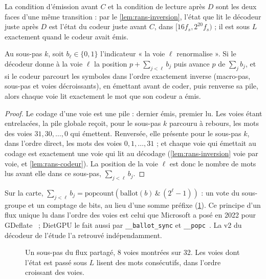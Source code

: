 La condition d'émission avant $C$ et la condition de lecture après $D$ sont les deux faces d'une même transition : par le \cref{lem:rans-inversion}, l'état que lit le décodeur juste après $D$ est l'état du codeur juste avant $C$, dans $[16 f_s, 2^{20} f_s)$ ; il est sous $L$ exactement quand le codeur avait émis.

\begin{lemme}\label{lem:flux-partage}
Au sous-pas $k$, soit $b_\ell \in \{0,1\}$ l'indicateur « la voie $\ell$ renormalise ». Si le décodeur donne à la voie $\ell$ la position $p + \sum_{j<\ell} b_j$ puis avance $p$ de $\sum_j b_j$, et si le codeur parcourt les symboles dans l'ordre exactement inverse (macro-pas, sous-pas et voies décroissants), en émettant avant de coder, puis renverse sa pile, alors chaque voie lit exactement le mot que son codeur a émis.
\end{lemme}

\begin{proof}
Le codage d'une voie est une pile : dernier émis, premier lu. Les voies étant entrelacées, la pile globale reçoit, pour le sous-pas $k$ parcouru à rebours, les mots des voies $31, 30, \ldots, 0$ qui émettent. Renversée, elle présente pour le sous-pas $k$, dans l'ordre direct, les mots des voies $0, 1, \ldots, 31$ ; et chaque voie qui émettait au codage est exactement une voie qui lit au décodage (\cref{lem:rans-inversion} voie par voie, et \cref{lem:rans-codeur}). La position de la voie $\ell$ est donc le nombre de mots lus avant elle dans ce sous-pas, $\sum_{j<\ell} b_j$.
\end{proof}

Sur la carte, $\sum_{j<\ell} b_j = \mathrm{popcount}(\mathrm{ballot}(b) \,\&\, (2^\ell - 1))$ : un vote du sous-groupe et un comptage de bits, au lieu d'une somme préfixe (\cref{fig:flux-partage}). Ce principe d'un flux unique lu dans l'ordre des voies est celui que Microsoft a posé en 2022 pour GDeflate~\cite{directstorage14} ; DietGPU le fait aussi par \texttt{\_\_ballot\_sync} et \texttt{\_\_popc}~\cite{dietgpu}. La v2 du décodeur de l'étude l'a retrouvé indépendamment.

\begin{figure}[ht]
\centering
\resizebox{0.96\linewidth}{!}{\SchemaFluxPartage}
\caption[Le flux partagé : vote et comptage de bits]{Un sous-pas du flux partagé, 8 voies montrées sur 32. Les voies dont l'état est passé sous $L$ lisent des mots consécutifs, dans l'ordre croissant des voies.}
\label{fig:flux-partage}
\end{figure}

